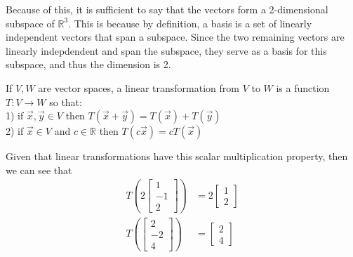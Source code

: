 \documentclass{report}
\begin{document}
Because of this, it is sufficient to say that the vectors form a 2-dimensional subspace of $\mathbb{R}^3$. This is because by definition, a basis is a set of linearly independent vectors that span a subspace. Since the two remaining vectors are linearly indepdendent and span the subspace, they serve as a basis for this subspace, and thus the dimension is 2.
\begin{note}
If $V, W$ are vector spaces, a linear transformation from $V$ to $W$ is a function $T: V \rightarrow W$ so that: \\
1) if $\vec{x},\vec{y}\in V$ then $T(\vec{x}+\vec{y}) = T(\vec{x}) + T(\vec{y})$ \\
2) if $\vec{x} \in V$ and $c\in\mathbb{R}$ then $T(c\vec{x}) = cT(\vec{x})$
\end{note}
\sol Given that linear transformations have this scalar multiplication property, then we can see that
$$
\begin{aligned}
	T\left(2\begin{bmatrix} 1 \\ -1 \\ 2 \end{bmatrix}\right) & = 2\begin{bmatrix} 1 \\ 2 \end{bmatrix} \\
	T\left(\begin{bmatrix} 2 \\ -2 \\ 4 \end{bmatrix}\right) & = \begin{bmatrix} 2 \\ 4 \end{bmatrix}
\end{aligned}
$$
\end{document}
